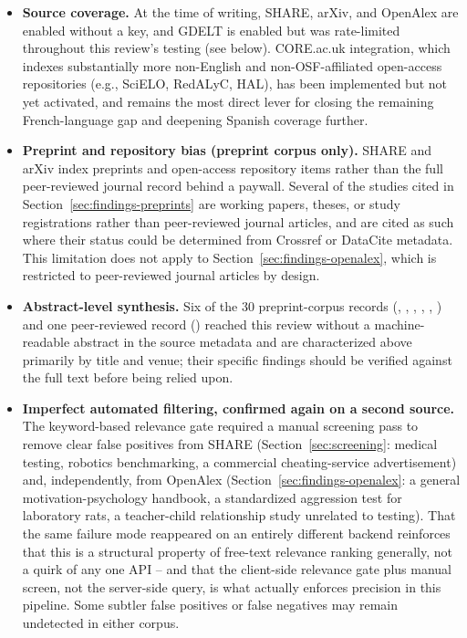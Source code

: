 \documentclass[11pt]{article}
\begin{document}
\begin{itemize}[leftmargin=*]
    \item \textbf{Source coverage.} At the time of writing, SHARE, arXiv, and OpenAlex are enabled without a key, and GDELT is enabled but was rate-limited throughout this review's testing (see below). CORE.ac.uk integration, which indexes substantially more non-English and non-OSF-affiliated open-access repositories (e.g., SciELO, RedALyC, HAL), has been implemented but not yet activated, and remains the most direct lever for closing the remaining French-language gap and deepening Spanish coverage further.
    \item \textbf{Preprint and repository bias (preprint corpus only).} SHARE and arXiv index preprints and open-access repository items rather than the full peer-reviewed journal record behind a paywall. Several of the studies cited in Section~\ref{sec:findings-preprints} are working papers, theses, or study registrations rather than peer-reviewed journal articles, and are cited as such where their status could be determined from Crossref or DataCite metadata. This limitation does not apply to Section~\ref{sec:findings-openalex}, which is restricted to peer-reviewed journal articles by design.
    \item \textbf{Abstract-level synthesis.} Six of the 30 preprint-corpus records (\citet{stierwalt2000explanations}, \citet{zhou2024genderforced}, \citet{weick2024instruction}, \citet{reese2004teachersperceptions}, \citet{wallace2010motivation}, \citet{tseng2024taiwanese}) and one peer-reviewed record (\citet{vonderembse2017metaanalysis}) reached this review without a machine-readable abstract in the source metadata and are characterized above primarily by title and venue; their specific findings should be verified against the full text before being relied upon.
    \item \textbf{Imperfect automated filtering, confirmed again on a second source.} The keyword-based relevance gate required a manual screening pass to remove clear false positives from SHARE (Section~\ref{sec:screening}: medical testing, robotics benchmarking, a commercial cheating-service advertisement) and, independently, from OpenAlex (Section~\ref{sec:findings-openalex}: a general motivation-psychology handbook, a standardized aggression test for laboratory rats, a teacher-child relationship study unrelated to testing). That the same failure mode reappeared on an entirely different backend reinforces that this is a structural property of free-text relevance ranking generally, not a quirk of any one API -- and that the client-side relevance gate plus manual screen, not the server-side query, is what actually enforces precision in this pipeline. Some subtler false positives or false negatives may remain undetected in either corpus.

\end{itemize}
\end{document}
